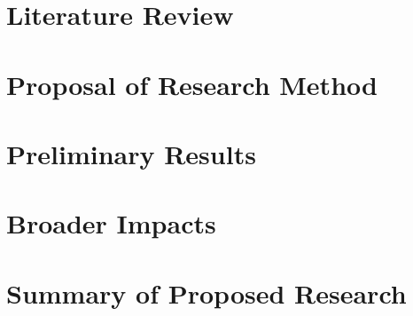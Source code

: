 \section{Literature Review}

\section{Proposal of Research Method}

\section{Preliminary Results}

\section{Broader Impacts}

\section{Summary of Proposed Research}